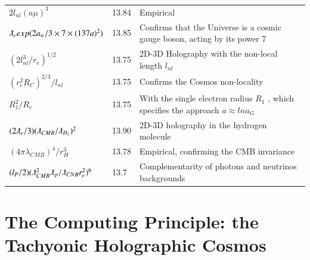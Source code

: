 \documentclass[a4paper,9pt]{article}
\begin{document}
\begin{table}
\begin{tabular}{lll}
 
 $ 2l_{nl}(a\mu)^3 $ & 13.84 & Empirical \\
 
 
 
 
 
 
 $ \lambdabar_{e} exp(2a_w/3\times 7 \times(137a)^2) $ & 13.85 & Confirms that the Universe is a cosmic gauge boson, acting by its power 7 \\ 
 
 
 
 $ (2l_{nl}^3/r_e)^{1/2}$  & 13.75    & 2D-3D Holography with the non-local length $l_{nl}$ \\
 
  $ (r_e^2R_C)^{2/3}/l_{nl}$  & 13.75    & Confirms the Cosmos non-locality \\
  
  $ R_1^2/R_e$  & 13.75    & With the single electron radius $R_1$ \cite{Sanchez3}, which specifies the approach  $a \approx lna_G$ \cite{Rees}   \\
 
 
 $ (2\lambdabar_{e}/3) (\lambdabar_{CMB}/\lambdabar_{H_2})^2$ & 13.90 &  2D-3D holography in the hydrogen molecule \\
     
   $ (4\pi \lambda_{CMB})^4/r_H^3$ & 13.78 &  Empirical, confirming the CMB invariance \\
   
    $ (l_P/2)(\lambdabar_{CMB}^2\lambdabar_p/\lambdabar_{CNB}r_e^2)^6$  & 13.7    & Complementarity of photons and neutrinos backgrounds \\
   
 
 
 \bottomrule
  \end{tabular}
\end{table} 
 
 
 

\section{The Computing Principle: the Tachyonic Holographic Cosmos}
\end{document}

